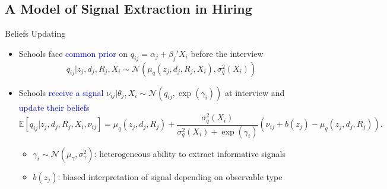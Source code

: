 \documentclass[compress,10pt,aspectratio=169]{beamer}
\newcommand\emphblue[1]{\textcolor{blue}{#1}}
\begin{document}
\subsection{A Model of Signal Extraction in Hiring}



\begin{frame}{Beliefs Updating}
    \begin{itemize}
        \item Schools face \emphblue{common prior} on $q_{ij}=\alpha_j+\beta_j'X_i$ before the interview
        $$
        q_{ij}|z_j,d_j,R_j, X_i \sim \mathcal{N}(\mu_q(z_j,d_j,R_j, X_i),\sigma^2_q( X_i))
        $$
        \smallskip
        \item Schools \emphblue{receive a signal} $\nu_{ij}|\theta_j,X_i \sim \mathcal{N}(q_{ij},\exp(\gamma_i))$ at interview and \emphblue{update their beliefs}
$$
\mathbb{E}[q_{ij}|z_j,d_j,R_j, X_i, \nu_{ij}]=\mu_q(z_j,d_j,R_j)+\frac{\sigma_{q}^2( X_i)}{\sigma_{q}^2( X_i)+\exp(\gamma_i)}(\nu_{ij}+b(z_j)-\mu_q(z_j,d_j,R_j)).
$$
\begin{itemize}
    \item[$\Rightarrow$] $\gamma_i \sim \mathcal{N}(\mu_{\gamma},\sigma_{\gamma}^2)$: heterogeneous ability to extract informative signals
    \medskip
    \item[$\Rightarrow$] $b(z_j)$: biased interpretation of signal depending on observable type
\end{itemize}
    \end{itemize}
\end{frame}
\end{document}
